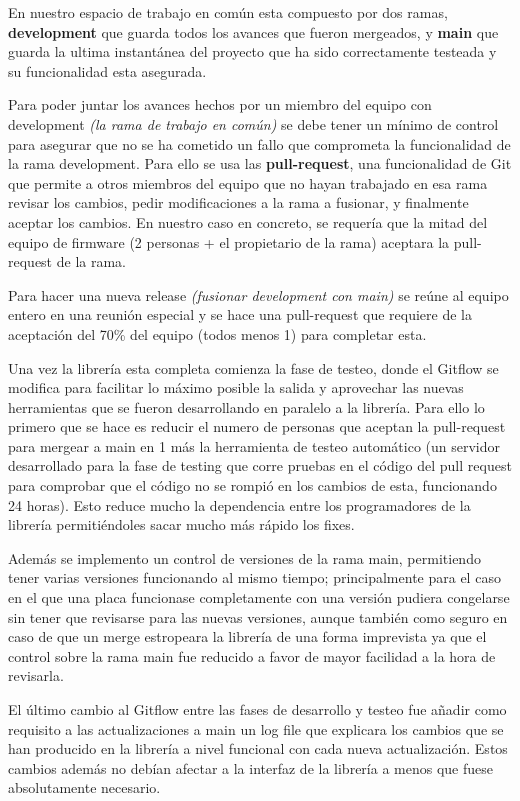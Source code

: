 \documentclass{report}
\begin{document}
En nuestro espacio de trabajo en común esta compuesto por dos ramas, \textbf{development} que guarda todos los avances que fueron mergeados, y \textbf{main} que guarda la ultima instantánea del proyecto que ha sido correctamente testeada y su funcionalidad esta asegurada. \par
Para poder juntar los avances hechos por un miembro del equipo con development \textit{(la rama de trabajo en común)} se debe tener un mínimo de control para asegurar que no se ha cometido un fallo que comprometa la funcionalidad de la rama development. Para ello se usa las \textbf{pull-request}, una funcionalidad de Git que permite a otros miembros del equipo que no hayan trabajado en esa rama revisar los cambios, pedir modificaciones a la rama a fusionar, y finalmente aceptar los cambios. En nuestro caso en concreto, se requería que la mitad del equipo de firmware (2 personas + el propietario de la rama) aceptara la pull-request de la rama. \par
Para hacer una nueva release \textit{(fusionar development con main)} se reúne al equipo entero en una reunión especial y se hace una pull-request que requiere de la aceptación del 70\% del equipo (todos menos 1) para completar esta. 
\par \vspace{0.3 cm}

Una vez la librería esta completa comienza la fase de testeo, donde el Gitflow se modifica para facilitar lo máximo posible la salida y aprovechar las nuevas herramientas que se fueron desarrollando en paralelo a la librería. Para ello lo primero que se hace es reducir el numero de personas que aceptan la pull-request para mergear a main en 1 más la herramienta de testeo automático (un servidor desarrollado para la fase de testing que corre pruebas en el código del pull request para comprobar que el código no se rompió en los cambios de esta, funcionando 24 horas). Esto reduce mucho la dependencia entre los programadores de la librería permitiéndoles sacar mucho más rápido los fixes. \par
Además se implemento un control de versiones de la rama main, permitiendo tener varias versiones funcionando al mismo tiempo; principalmente para el caso en el que una placa funcionase completamente con una versión pudiera congelarse sin tener que revisarse para las nuevas versiones, aunque también como seguro en caso de que un merge estropeara la librería de una forma imprevista ya que el control sobre la rama main fue reducido a favor de mayor facilidad a la hora de revisarla. \par
El último cambio al Gitflow entre las fases de desarrollo y testeo fue añadir como requisito a las actualizaciones a main un log file que explicara los cambios que se han producido en la librería a nivel funcional con cada nueva actualización. Estos cambios además no debían afectar a la interfaz de la librería a menos que fuese absolutamente necesario. 
\par \vspace{0.3 cm}
\end{document}
